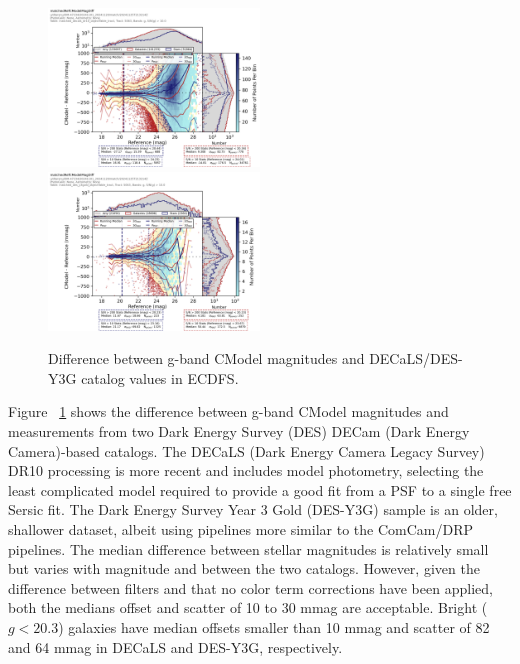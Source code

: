 \begin{figure}
  \label{fig:cdfs_g_vs_des}
  \includegraphics[width=0.5\textwidth]{galaxy_photometry/cdfs_g_vs_DECaLS.png}
  \includegraphics[width=0.5\textwidth]{galaxy_photometry/cdfs_g_vs_desy3g.png}
  \caption{Difference between g-band CModel magnitudes and DECaLS/DES-Y3G catalog values in ECDFS.}
\end{figure}

Figure ~\ref{fig:cdfs_g_vs_des} shows the difference between g-band CModel magnitudes and measurements from two Dark Energy Survey (DES) DECam (Dark Energy Camera)-based catalogs.
The DECaLS (Dark Energy Camera Legacy Survey) DR10 processing is more recent and includes model photometry, selecting the least complicated model required to provide a good fit from a PSF to a single free Sersic fit.
The Dark Energy Survey Year 3 Gold (DES-Y3G) sample is an older, shallower dataset, albeit using pipelines more similar to the ComCam/DRP pipelines.
The median difference between stellar magnitudes is relatively small but varies with magnitude and between the two catalogs.
However, given the difference between filters and that no color term corrections have been applied, both the medians offset and scatter of 10 to 30 mmag are acceptable.
Bright ($g < 20.3$) galaxies have median offsets smaller than 10 mmag and scatter of 82 and 64 mmag in DECaLS and DES-Y3G, respectively.

